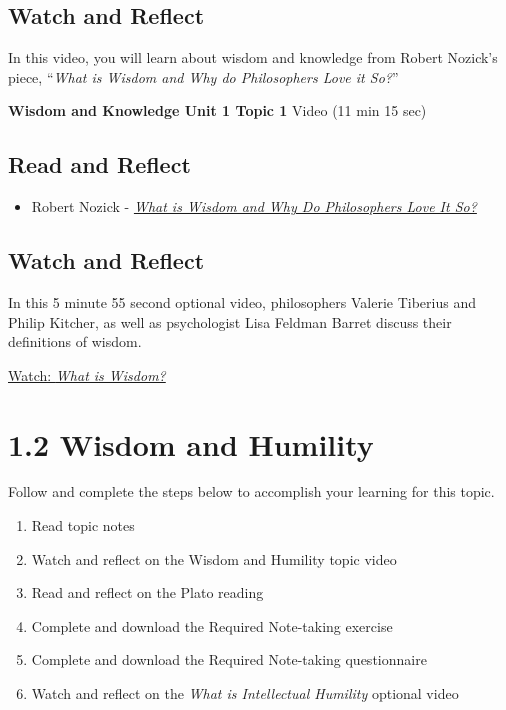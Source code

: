 \documentclass[
]{book}
\providecommand{\tightlist}{%
  \setlength{\itemsep}{0pt}\setlength{\parskip}{0pt}}
\begin{document}
\hypertarget{watch-and-reflect}{%
\subsection*{Watch and Reflect}\label{watch-and-reflect}}

In this video, you will learn about wisdom and knowledge from Robert Nozick's piece, ``\emph{What is Wisdom and Why do Philosophers Love it So?}''

\textbf{Wisdom and Knowledge Unit 1 Topic 1} Video (11 min 15 sec)

\hypertarget{read-and-reflect}{%
\subsection*{Read and Reflect}\label{read-and-reflect}}

\begin{itemize}
\tightlist
\item
  Robert Nozick - \href{assets/u1/PHIL-100-Nozick-What-is-Wisdom.pdf}{\emph{What is Wisdom and Why Do Philosophers Love It So?}}
\end{itemize}

\hypertarget{watch-and-reflect-1}{%
\subsection*{Watch and Reflect}\label{watch-and-reflect-1}}

\begin{reflect}
In this 5 minute 55 second optional video, philosophers Valerie Tiberius and Philip Kitcher, as well as psychologist Lisa Feldman Barret discuss their definitions of wisdom.

\href{https://youtu.be/obqedyeUcwk}{Watch: \emph{What is Wisdom?}}
\end{reflect}

\hypertarget{wisdom-and-humility}{%
\section*{1.2 Wisdom and Humility}\label{wisdom-and-humility}}

Follow and complete the steps below to accomplish your learning for this topic.

\begin{enumerate}
\def\labelenumi{\arabic{enumi}.}
\tightlist
\item
  Read topic notes
\item
  Watch and reflect on the Wisdom and Humility topic video
\item
  Read and reflect on the Plato reading
\item
  Complete and download the Required Note-taking exercise
\item
  Complete and download the Required Note-taking questionnaire
\item
  Watch and reflect on the \emph{What is Intellectual Humility} optional video
\end{enumerate}
\end{document}
